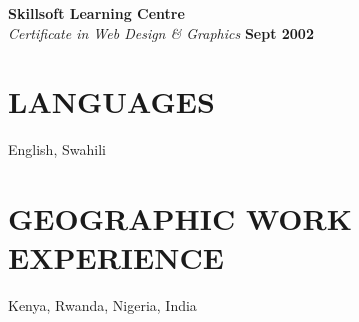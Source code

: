 \documentclass{res}
\begin{document}
\begin{resume}
\vspace{8pt} 
\textbf{Skillsoft Learning Centre}  \\
\emph{Certificate in Web Design & Graphics} \hfill \textbf{Sept 2002}


\section{LANGUAGES} 
\vspace{8pt}
English, Swahili

\section{GEOGRAPHIC WORK EXPERIENCE} 
\vspace{8pt}
Kenya, Rwanda, Nigeria, India

\end{resume} 
\end{document}
